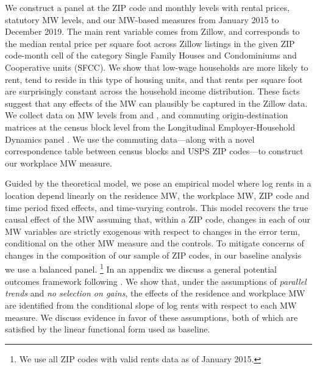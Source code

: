 We construct a panel at the ZIP code and monthly levels with rental prices, 
statutory MW levels, and our MW-based measures from January 2015 to December 2019.
The main rent variable comes from Zillow, and corresponds to the median 
rental price per square foot across Zillow listings in the given ZIP 
code-month cell of the category Single Family Houses and Condominiums and 
Cooperative units (SFCC).
We show that low-wage households are more likely to rent,
tend to reside in this type of housing units,
and that rents per square foot are surprisingly constant across the household
income distribution.
These facts suggest that any effects of the MW can plausibly be captured 
in the Zillow data.
We collect data on MW levels from \textcite{VaghulZipperer2016} and 
\textcite{BerkeleyLaborCenter}, and commuting origin-destination matrices at the
census block level from the Longitudinal Employer-Household Dynamics panel 
\parencite{CensusLODES}.
We use the commuting data---along with a novel correspondence table between census
blocks and USPS ZIP codes---to construct our workplace MW measure.


Guided by the theoretical model, we pose an empirical model where log rents in 
a location depend linearly on
the residence MW, %
the workplace MW, %
ZIP code and time period fixed effects, and 
time-varying controls.
This model recovers the true causal effect of the MW assuming that, 
within a ZIP code, changes in each of our MW variables are 
strictly exogenous with respect to changes in the error term, 
conditional on the other MW measure and the controls.
To mitigate concerns of changes in the composition of our sample of ZIP codes, 
in our baseline analysis we use a balanced panel.%
\footnote{We use all ZIP codes with valid rents data as of January 2015.}
In an appendix we discuss a general potential outcomes framework following
\textcite{CallawayEtAl2021}.
We show that, under the assumptions of \textit{parallel trends} and 
\textit{no selection on gains}, 
the effects of the residence and workplace MW are identified from the 
conditional slope of log rents with respect to each MW measure.
We discuss evidence in favor of these assumptions, both of which are satisfied 
by the linear functional form used as baseline.

